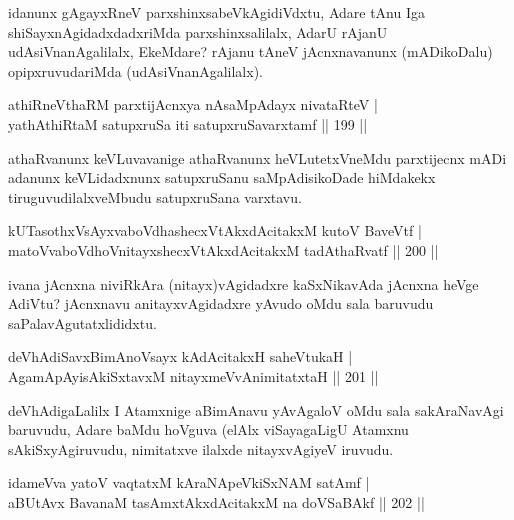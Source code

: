 \begin{artha}
idanunx gAgayxRneV parxshinxsabeVkAgidiVdxtu, Adare tAnu Iga shiSayxnAgidadxdadxriMda parxshinxsalilalx, AdarU rAjanU udAsiVnanAgalilalx, EkeMdare? rAjanu tAneV jAcnxnavanunx (mADikoDalu) opipxruvudariMda (udAsiVnanAgalilalx).
\end{artha}

\begin{shl}
athiRneV\s thaRM parxtijAcnxya nAsaMpAdayx nivataRteV |\\
yathAthiRtaM satupxruSa  iti satupxruSavarxtamf \hfill || 199 ||
\end{shl}

\begin{artha}
athaRvanunx keVLuvavanige athaRvanunx heVLutetxVneMdu parxtijecnx mADi adanunx keVLidadxnunx satupxruSanu saMpAdisikoDade hiMdakekx tiruguvudilalxveMbudu satupxruSana varxtavu.
\end{artha}

\begin{shl}
kUTasothxV\s sAyxvaboVdhashecxVtAkxdAcitakxM kutoV BaveVtf |\\
matoV\s vaboVdhoV\s nitayxshecxVtAkxdAcitakxM tadA\s thaRvatf \hfill || 200 ||
\end{shl}

\begin{artha}
ivana jAcnxna niviRkAra (nitayx)vAgidadxre kaSxNikavAda jAcnxna heVge AdiVtu? jAcnxnavu anitayxvAgidadxre yAvudo oMdu sala baruvudu saPalavAgutatxlididxtu.
\end{artha}

\begin{shl}
deVhAdiSavxBimAnoV\s sayx kAdAcitakxH saheVtukaH |\\
AgamApAyisAkiSxtavxM nitayxmeVvAnimitatxtaH \hfill || 201 ||
\end{shl}


\begin{artha}
deVhAdigaLalilx I Atamxnige aBimAnavu yAvAgaloV oMdu sala sakAraNavAgi baruvudu, Adare baMdu hoVguva (elAlx viSayagaLigU Atamxnu sAkiSxyAgiruvudu, nimitatxve ilalxde nitayxvAgiyeV iruvudu.
\end{artha}

\begin{shl}
idameVva yatoV vaqtatxM kAraNApeVkiSxNAM satAmf |\\
aBUtAvx BavanaM tasAmxtAkxdAcitakxM na doVSaBAkf \hfill || 202 ||
\end{shl}

